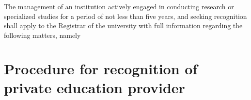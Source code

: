 \documentclass[reprint]{mhact}
\begin{document}
    
      

      \begin{subsectionlist}
    

The management of an institution actively engaged in conducting research or specialized studies for a period of not less than five years, and seeking recognition shall apply to the Registrar of the university with full information regarding the following matters, namely

       \end{subsectionlist}
    
      \section{Procedure for recognition of private education provider}
      
\end{document}
